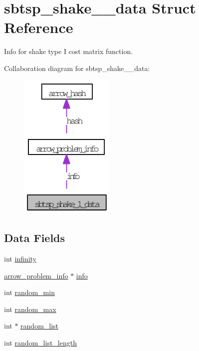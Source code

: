 \hypertarget{structsbtsp__shake__1__data}{
\section{sbtsp\_\-shake\_\_\-data Struct Reference}
\label{structsbtsp__shake__1__data}
}
Info for shake type I cost matrix function.  


Collaboration diagram for sbtsp\_\-shake\_\_\-data:\nopagebreak
\begin{figure}[H]
\begin{center}
\leavevmode
\includegraphics[width=128pt]{structsbtsp__shake__1__data__coll__graph}
\end{center}
\end{figure}
\subsection*{Data Fields}
\begin{CompactItemize}
\item 
int \hyperlink{structsbtsp__shake__1__data_47ef3fa3aae68c0dc3c41d4669f12029}{infinity}
\item 
\hyperlink{structarrow__problem__info}{arrow\_\-problem\_\-info} $\ast$ \hyperlink{structsbtsp__shake__1__data_3a8115357fcf4016ea804a21bd68168c}{info}
\item 
int \hyperlink{structsbtsp__shake__1__data_0ebb01b40f55ff2c48f39fcccbd4af80}{random\_\-min}
\item 
int \hyperlink{structsbtsp__shake__1__data_bfa7c0245c2d6e8f6f2f683078c6bcdf}{random\_\-max}
\item 
int $\ast$ \hyperlink{structsbtsp__shake__1__data_c518a861d13f3260420bce5fbe0c669c}{random\_\-list}
\item 
int \hyperlink{structsbtsp__shake__1__data_a74ff99394d80777bb57ec5560fb3d71}{random\_\-list\_\-length}
\end{CompactItemize}


